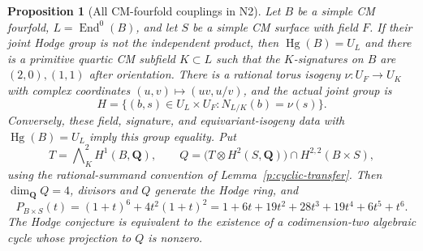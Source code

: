 \documentclass[10pt,reqno]{article}
\theoremstyle{emphasizedplain}
\newtheorem{proposition}[theorem]{Proposition}
\theoremstyle{emphasizeddefinition}
\theoremstyle{emphasizeddefinition}
\DeclareMathOperator{\End}{End}
\DeclareMathOperator{\Hg}{Hg}
\newcommand{\Q}{\mathbf Q}
\begin{document}
\begin{proposition}[All CM-fourfold couplings in N2]
\label{p:N2CMstructure}
Let $B$ be a simple CM fourfold, $L=\End^0(B)$, and let $S$ be
a simple CM surface with field $F$. If their joint Hodge group
is not the independent product, then $\Hg(B)=U_L$ and there is
a primitive quartic CM subfield $K\subset L$ such that the
$K$-signatures on $B$ are $(2,0),(1,1)$ after orientation.
There is a rational torus isogeny $\nu:U_F\to U_K$ with complex
coordinates $(u,v)\mapsto(uv,u/v)$, and the actual joint group is
\[
 H=\{(b,s)\in U_L\times U_F:N_{L/K}(b)=\nu(s)\}.
\]
Conversely, these field, signature, and equivariant-isogeny data
with $\Hg(B)=U_L$ imply this group equality. Put
\[
 T=\bigwedge\nolimits_K^2H^1(B,\Q),\qquad
 Q=\bigl(T\otimes H^2(S,\Q)\bigr)\cap H^{2,2}(B\times S),
\]
using the rational-summand convention of Lemma~\ref{p:cyclic-transfer}.
Then $\dim_\Q Q=4$, divisors and $Q$ generate the Hodge ring, and
\[
 P_{B\times S}(t)=(1+t)^6+4t^2(1+t)^2
 =1+6t+19t^2+28t^3+19t^4+6t^5+t^6.
\]
The Hodge conjecture is equivalent to the existence of a
codimension-two algebraic cycle whose projection to $Q$ is nonzero.
\end{proposition}
\end{document}
